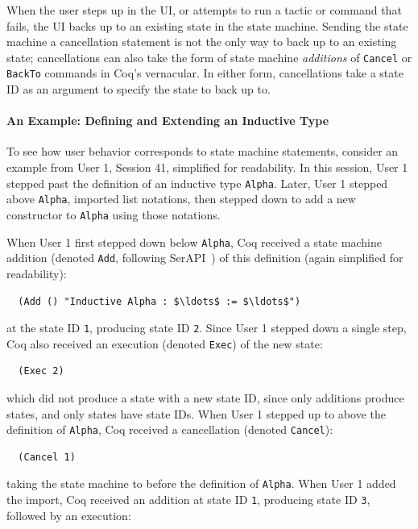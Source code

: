 When the user steps up in the UI, or attempts to run a tactic or command
that fails, the UI backs up to an existing state in the state machine.
Sending the state machine a cancellation statement is not the only way to back up to
an existing state; cancellations can also take the form of state machine
\textit{additions} of \lstinline{Cancel} or \lstinline{BackTo} commands
in Coq's vernacular. In either form, cancellations take a state ID
as an argument to specify the state to back up to.

\paragraph{An Example: Defining and Extending an Inductive Type}
To see how user behavior corresponds to state machine statements,
consider an example from User 1, Session 41, simplified for readability.
In this session, User 1 stepped past
the definition of an inductive type \lstinline{Alpha}. Later, User 1
stepped above \lstinline{Alpha}, imported list notations,
then stepped down to add a new constructor to \lstinline{Alpha}
using those notations.

When User 1 first stepped down below \lstinline{Alpha},
Coq received a state machine addition (denoted
\lstinline{Add}, following SerAPI~\cite{GallegoArias2016SerAPI})
of this definition (again simplified for readability):

\begin{lstlisting}
  (Add () "Inductive Alpha : $\ldots$ := $\ldots$")
\end{lstlisting}
at the state ID \lstinline{1}, producing state ID \lstinline{2}.
Since User 1 stepped down a single step, Coq also received
an execution (denoted \lstinline{Exec}) of the new state:

\begin{lstlisting}
  (Exec 2)
\end{lstlisting}
which did not produce a state with a new state ID, since only additions
produce states, and only states have state IDs.
When User 1 stepped up to above the definition of \lstinline{Alpha},
Coq received a cancellation (denoted \lstinline{Cancel}):

\begin{lstlisting}
  (Cancel 1)
\end{lstlisting}
taking the state machine to before the definition of \lstinline{Alpha}.
When User 1 added the import, Coq
received an addition at state ID \lstinline{1}, producing state ID
\lstinline{3}, followed by an execution:

